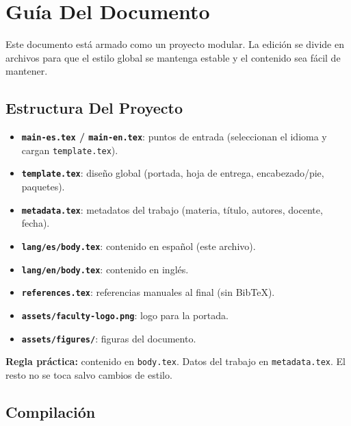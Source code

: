 
\section{Guía Del Documento}
\vspace{2mm}

Este documento está armado como un proyecto modular. La edición se divide en archivos para que el estilo global se mantenga estable y el contenido sea fácil de mantener.


\subsection{Estructura Del Proyecto}
\vspace{2mm}

\begin{itemize}
  \item \textbf{\texttt{main-es.tex} / \texttt{main-en.tex}}: puntos de entrada (seleccionan el idioma y cargan \texttt{template.tex}).
  \item \textbf{\texttt{template.tex}}: diseño global (portada, hoja de entrega, encabezado/pie, paquetes).
  \item \textbf{\texttt{metadata.tex}}: metadatos del trabajo (materia, título, autores, docente, fecha).
  \item \textbf{\texttt{lang/es/body.tex}}: contenido en español (este archivo).
  \item \textbf{\texttt{lang/en/body.tex}}: contenido en inglés.
  \item \textbf{\texttt{references.tex}}: referencias manuales al final (sin BibTeX).
  \item \textbf{\texttt{assets/faculty-logo.png}}: logo para la portada.
  \item \textbf{\texttt{assets/figures/}}: figuras del documento.
\end{itemize}

\vspace{2mm}

\noindent
\textbf{Regla práctica:} contenido en \texttt{body.tex}. Datos del trabajo en \texttt{metadata.tex}. El resto no se toca salvo cambios de estilo.


\subsection{Compilación}
\vspace{2mm}

